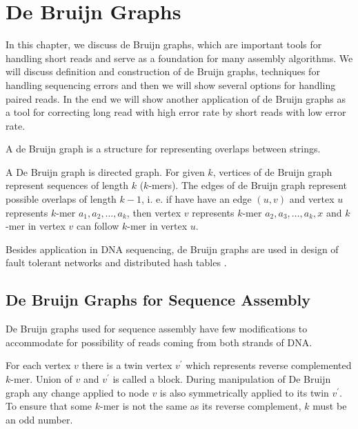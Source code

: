 \chapter{De Bruijn Graphs}

In this chapter, we discuss de Bruijn graphs, which are important tools
for handling short reads and serve as a foundation for many assembly algorithms.
We will discuss definition and construction of de Bruijn graphs,
techniques for handling sequencing errors and then we will show several
options for handling paired reads. In the end we will show another
application of de Bruijn graphs as a tool for correcting long read with high error
rate by short reads with low error rate.

\bigskip

A de Bruijn graph \citep{de1946combinatorial} is a structure for representing
overlaps between strings.

\begin{definition}
A De Bruijn graph is directed graph. 
For given $k$, vertices of de Bruijn graph represent sequences of length $k$
($k$-mers). The edges of de Bruijn graph represent possible overlaps of length $k-1$, i. e. 
if have have an edge $(u, v)$ and vertex $u$ represents $k$-mer $a_1, a_2, \dots, a_k$, then
vertex $v$ represents $k$-mer $a_2, a_3, \dots, a_k, x$ and $k$-mer in vertex $v$ can
follow $k$-mer in vertex $u$.
\end{definition}

Besides application in DNA sequencing, de Bruijn graphs are used
in design of fault tolerant networks \citep{ftndeb} and 
distributed hash tables \citep{koorde}.

\section{De Bruijn Graphs for Sequence Assembly}


De Bruijn graphs used for sequence assembly
\citep{pevzner2001eulerian,Velvet} have few modifications
to accommodate for possibility of reads coming from both strands of DNA.

For each vertex $v$ there is a twin vertex $v^{'}$ which
represents reverse complemented $k$-mer. Union of $v$ and $v^{'}$ is called a block.
During manipulation of De Bruijn graph any change applied to node $v$ is also symmetrically
applied to its twin $v^{'}$.
To ensure that some $k$-mer is not the same as its reverse complement, $k$ must be an odd number.

